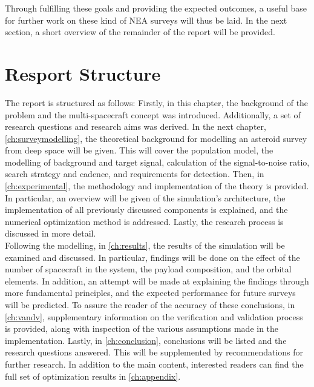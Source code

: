 Through fulfilling these goals and providing the expected outcomes, a useful base for further work on these kind of NEA surveys will thus be laid. In the next section, a short overview of the remainder of the report will be provided.

\section{Resport Structure}
\label{sec:reportstructure}
The report is structured as follows: Firstly, in this chapter, the background of the problem and the multi-spacecraft concept was introduced. Additionally, a set of research questions and research aims was derived. In the next chapter, \autoref{ch:surveymodelling}, the theoretical background for modelling an asteroid survey from deep space will be given. This will cover the population model, the modelling of background and target signal, calculation of the signal-to-noise ratio, search strategy and cadence, and requirements for detection. Then, in \autoref{ch:experimental}, the methodology and implementation of the theory is provided. In particular, an overview will be given of the simulation's architecture, the implementation of all previously discussed components is explained, and the numerical optimization method is addressed. Lastly, the research process is discussed in more detail. \\

Following the modelling, in \autoref{ch:results}, the results of the simulation will be examined and discussed. In particular, findings will be done on the effect of the number of spacecraft in the system, the payload composition, and the orbital elements. In addition, an attempt will be made at explaining the findings through more fundamental principles, and the expected performance for future surveys will be predicted. To assure the reader of the accuracy of these conclusions, in \autoref{ch:vandv}, supplementary information on the verification and validation process is provided, along with inspection of the various assumptions made in the implementation. Lastly, in \autoref{ch:conclusion}, conclusions will be listed and the research questions answered. This will be supplemented by recommendations for further research. In addition to the main content, interested readers can find the full set of optimization results in \autoref{ch:appendix}.
